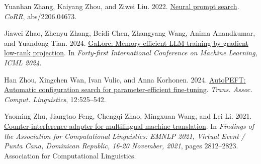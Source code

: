 \documentclass[11pt,dvipsnames]{article}
\begin{document}
{\begin{thebibliography}{73}
Yuanhan Zhang, Kaiyang Zhou, and Ziwei Liu. 2022{}.
\newblock \href {https://doi.org/10.48550/ARXIV.2206.04673} {Neural prompt
  search}.
\newblock \emph{CoRR}, abs/2206.04673.

Jiawei Zhao, Zhenyu Zhang, Beidi Chen, Zhangyang Wang, Anima Anandkumar, and
  Yuandong Tian. 2024.
\newblock \href {https://openreview.net/forum?id=hYHsrKDiX7} {{GaLore}:
  Memory-efficient {LLM} training by gradient low-rank projection}.
\newblock In \emph{Forty-first International Conference on Machine Learning,
  {ICML} 2024}.

Han Zhou, Xingchen Wan, Ivan Vulic, and Anna Korhonen. 2024.
\newblock \href {https://doi.org/10.1162/TACL\_A\_00662} {{AutoPEFT}: Automatic
  configuration search for parameter-efficient fine-tuning}.
\newblock \emph{Trans. Assoc. Comput. Linguistics}, 12:525--542.

Yaoming Zhu, Jiangtao Feng, Chengqi Zhao, Mingxuan Wang, and Lei Li. 2021.
\newblock \href {https://doi.org/10.18653/V1/2021.FINDINGS-EMNLP.240}
  {Counter-interference adapter for multilingual machine translation}.
\newblock In \emph{Findings of the Association for Computational Linguistics:
  {EMNLP} 2021, Virtual Event / Punta Cana, Dominican Republic, 16-20 November,
  2021}, pages 2812--2823. Association for Computational Linguistics.

\end{thebibliography}
 
}
\clearpage


\end{document}
